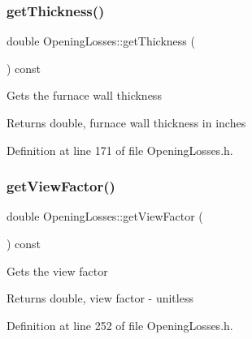 \mbox{\label{class_opening_losses_aeefdf4431056de65ca84c6dfb24b61e1}} 
\subsubsection{\texorpdfstring{get\+Thickness()}{getThickness()}}
{\footnotesize\ttfamily double Opening\+Losses\+::get\+Thickness (\begin{DoxyParamCaption}{ }\end{DoxyParamCaption}) const\hspace{0.3cm}{\ttfamily [inline]}}

Gets the furnace wall thickness \begin{DoxyReturn}{Returns}
double, furnace wall thickness in inches 
\end{DoxyReturn}


Definition at line 171 of file Opening\+Losses.\+h.

\mbox{\label{class_opening_losses_ae6633fab7a941e00b9770bee6a3af34d}} 
\subsubsection{\texorpdfstring{get\+View\+Factor()}{getViewFactor()}}
{\footnotesize\ttfamily double Opening\+Losses\+::get\+View\+Factor (\begin{DoxyParamCaption}{ }\end{DoxyParamCaption}) const\hspace{0.3cm}{\ttfamily [inline]}}

Gets the view factor \begin{DoxyReturn}{Returns}
double, view factor -\/ unitless 
\end{DoxyReturn}


Definition at line 252 of file Opening\+Losses.\+h.

\mbox{\label{class_opening_losses_a0374aeac5532188358b5f6ad0f120305}} 
